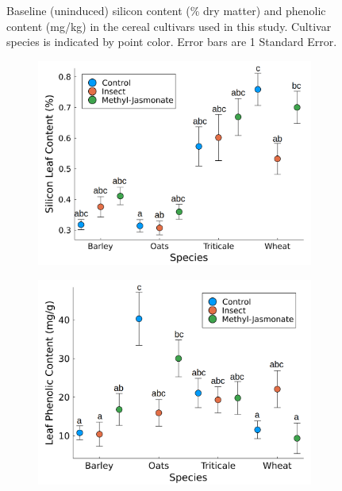 \documentclass[12pt, letterpaper, ]{report}
\begin{document}
\begin{figure}[h]
        \centering
        \caption{Baseline (uninduced) silicon content (\% dry matter) and phenolic content (mg/kg) in the cereal cultivars used in this study. Cultivar species is indicated by point color. Error bars are 1 Standard Error.}
        \label{Fig:baseline_si}
\end{figure}

\begin{figure}[h]
        \centering
        \begin{subfigure}[b]{0.49\textwidth}
                \centering
                \includegraphics[width = \textwidth]{images/induction_plot_letters.png}
        \end{subfigure}
        \begin{subfigure}[b]{0.49\textwidth}
                \centering
                \includegraphics[width = \textwidth]{images/phenolic_induction_plot_letters.png}

\end{subfigure}
\end{figure}
\end{document}
